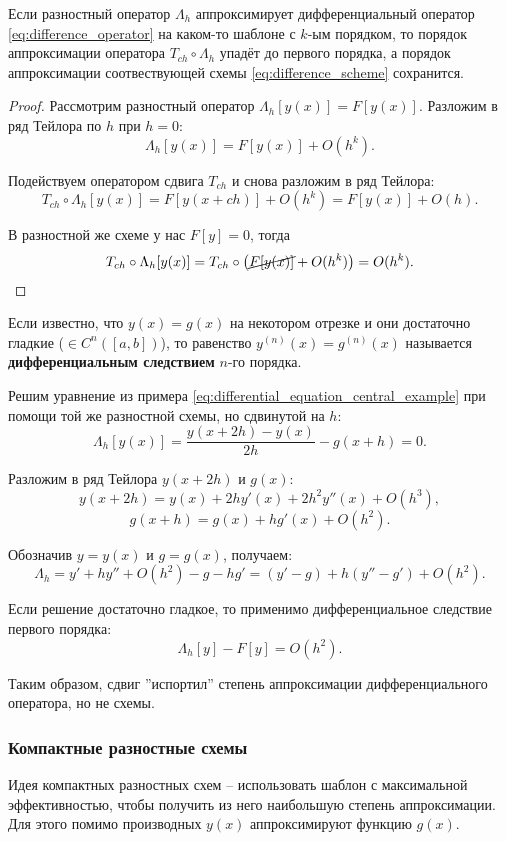 \documentclass[../main.tex]{subfile}
\begin{document}
\begin{theorem}
	Если разностный оператор $\Lambda_h$ аппроксимирует дифференциальный
	оператор \eqref{eq:difference_operator} на каком-то шаблоне с $k$-ым
	порядком, то порядок аппроксимации оператора $T_{ch}\circ\Lambda_h$
	упадёт до первого порядка, а порядок аппроксимации соотвествующей
	схемы \eqref{eq:difference_scheme} сохранится.
\end{theorem}

\begin{proof}
	Рассмотрим разностный оператор $\Lambda_h[y(x)]=F[y(x)]$.
	Разложим в ряд Тейлора по $h$ при $h=0$:
	\[\Lambda_h[y(x)]=F[y(x)]+O(h^k).\]

	Подействуем оператором сдвига $T_{ch}$ и снова разложим в ряд Тейлора:
	\[T_{ch}\circ\Lambda_h[y(x)]=F[y(x+ch)]+O(h^k)=F[y(x)]+O(h).\]

	В разностной же схеме у нас $F[y]=0$, тогда
	\[T_{ch}\circ\Lambda_h[y(x)]=T_{ch}\circ\big(\cancel{F[y(x)]}+O(h^k)
	\big)=O(h^k).\]
\end{proof}

\begin{define}\label{eq:difference_consequence}
	Если известно, что $y(x)=g(x)$ на некотором отрезке и они достаточно
	гладкие ($\in C^n([a,b])$), то равенство $y^{(n)}(x)=g^{(n)}(x)$
	называется \textbf{дифференциальным следствием} $n$-го порядка.
\end{define}

\begin{example}\label{eq:differential_equation_shift_example}
	Решим уравнение из примера
	\eqref{eq:differential_equation_central_example} при помощи той же
	разностной схемы, но сдвинутой на $h$:
	\[\Lambda_h[y(x)]=\frac{y(x+2h)-y(x)}{2h}-g(x+h)=0.\]

	Разложим в ряд Тейлора $y(x+2h)$ и $g(x)$:
	\[y(x+2h)=y(x)+2hy'(x)+2h^2y''(x)+O(h^3),\]
	\[g(x+h)=g(x)+hg'(x)+O(h^2).\]

	Обозначив $y=y(x)$ и $g=g(x)$, получаем:
	\[\Lambda_h=y'+hy''+O(h^2)-g-hg'=
	(y'-g)+h(y''-g')+O(h^2).\]

	Если решение достаточно гладкое, то применимо дифференциальное
	следствие первого порядка:
	\[\Lambda_h[y]-F[y]=O(h^2).\]

	Таким образом, сдвиг ''испортил'' степень аппроксимации
	дифференциального оператора, но не схемы.
\end{example}
\newpage

\subsubsection{Компактные разностные схемы}
Идея компактных разностных схем -- использовать шаблон с максимальной
эффективностью, чтобы получить из него наибольшую степень аппроксимации. Для
этого помимо производных $y(x)$ аппроксимируют функцию $g(x)$.
\end{document}
